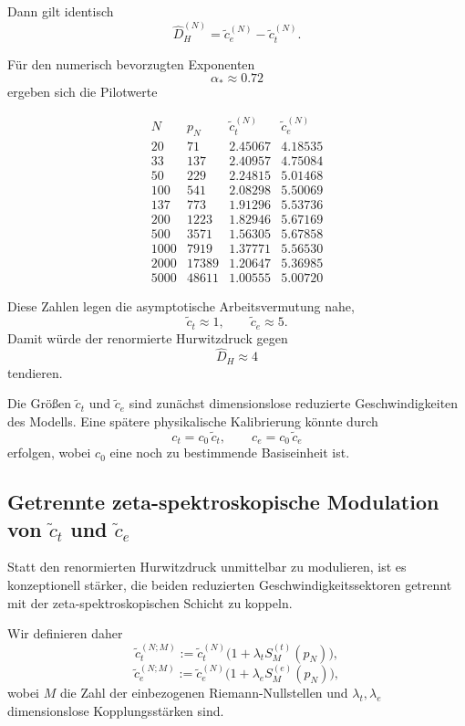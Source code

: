 \documentclass[12pt,a4paper]{article}
\theoremstyle{definition}
\begin{document}
	Dann gilt identisch
	\[
	\widehat D_H^{(N)}=\tilde c_e^{(N)}-\tilde c_t^{(N)}.
	\]
	
	Für den numerisch bevorzugten Exponenten
	\[
	\alpha_\ast \approx 0.72
	\]
	ergeben sich die Pilotwerte
	
	\[
	\begin{array}{r|r|r|r}
		N & p_N & \tilde c_t^{(N)} & \tilde c_e^{(N)}\\
		\hline
		20   & 71    & 2.45067 & 4.18535\\
		33   & 137   & 2.40957 & 4.75084\\
		50   & 229   & 2.24815 & 5.01468\\
		100  & 541   & 2.08298 & 5.50069\\
		137  & 773   & 1.91296 & 5.53736\\
		200  & 1223  & 1.82946 & 5.67169\\
		500  & 3571  & 1.56305 & 5.67858\\
		1000 & 7919  & 1.37771 & 5.56530\\
		2000 & 17389 & 1.20647 & 5.36985\\
		5000 & 48611 & 1.00555 & 5.00720
	\end{array}
	\]
	
	Diese Zahlen legen die asymptotische Arbeitsvermutung nahe,
	\[
	\tilde c_t \approx 1,
	\qquad
	\tilde c_e \approx 5.
	\]
	Damit würde der renormierte Hurwitzdruck gegen
	\[
	\widehat D_H \approx 4
	\]
	tendieren.
	
	Die Größen \( \tilde c_t \) und \( \tilde c_e \) sind zunächst dimensionslose reduzierte Geschwindigkeiten des Modells. Eine spätere physikalische Kalibrierung könnte durch
	\[
	c_t = c_0\,\tilde c_t,
	\qquad
	c_e = c_0\,\tilde c_e
	\]
	erfolgen, wobei \(c_0\) eine noch zu bestimmende Basiseinheit ist.
	
	\subsection{Getrennte zeta-spektroskopische Modulation von \( \tilde c_t \) und \( \tilde c_e \)}
	
	Statt den renormierten Hurwitzdruck unmittelbar zu modulieren, ist es konzeptionell stärker, die beiden reduzierten Geschwindigkeitssektoren getrennt mit der zeta-spektroskopischen Schicht zu koppeln.
	
	Wir definieren daher
	\[
	\tilde c_t^{(N;M)}
	:=
	\tilde c_t^{(N)}\bigl(1+\lambda_t S_M^{(t)}(p_N)\bigr),
	\]
	\[
	\tilde c_e^{(N;M)}
	:=
	\tilde c_e^{(N)}\bigl(1+\lambda_e S_M^{(e)}(p_N)\bigr),
	\]
	wobei \(M\) die Zahl der einbezogenen Riemann-Nullstellen und \(\lambda_t,\lambda_e\) dimensionslose Kopplungsstärken sind.
	
\end{document}
